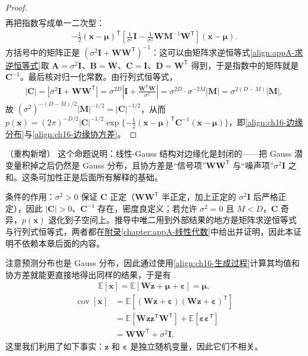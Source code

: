 \documentclass[../../main.tex]{subfiles}
\begin{document}
\begin{proof}
\begin{align*}
\end{align*}
再把指数写成单一二次型：
\begin{align*}
  -\frac{1}{2}(\bm{x}-\bm{\mu})^{\mathsf T}\left[\frac{1}{\sigma^2}\bm{I}-\frac{1}{\sigma^2}\bm{W}\bm{M}^{-1}\bm{W}^{\mathsf T}\right](\bm{x}-\bm{\mu}).
\end{align*}
方括号中的矩阵正是 $(\sigma^2\bm{I}+\bm{W}\bm{W}^{\mathsf T})^{-1}$：这可以由矩阵求逆恒等式\eqref{align:appA-求逆恒等式}取 $\bm{A}=\sigma^2\bm{I}$、$\bm{B}=\bm{W}$、$\bm{C}=\bm{I}$、$\bm{D}=\bm{W}^{\mathsf T}$ 得到，于是指数中的矩阵就是 $\bm{C}^{-1}$。最后核对归一化常数。由行列式恒等式，
\begin{align*}
  |\bm{C}|=\left|\sigma^2\bm{I}+\bm{W}\bm{W}^{\mathsf T}\right|=\sigma^{2D}\left|\bm{I}+\frac{\bm{W}^{\mathsf T}\bm{W}}{\sigma^2}\right|=\sigma^{2D}\cdot\sigma^{-2M}|\bm{M}|=\sigma^{2(D-M)}|\bm{M}|,
\end{align*}
故 $(\sigma^2)^{-(D-M)/2}|\bm{M}|^{-1/2}=|\bm{C}|^{-1/2}$，从而 $p(\bm{x})=(2\pi)^{-D/2}|\bm{C}|^{-1/2}\exp\{-\frac{1}{2}(\bm{x}-\bm{\mu})^{\mathsf T}\bm{C}^{-1}(\bm{x}-\bm{\mu})\}$，即\eqref{align:ch16-边缘分布}与\eqref{align:ch16-边缘协方差}。
\end{proof}

\begin{remark}（重构新增）
这个命题说明：线性-Gauss 结构对边缘化是封闭的——把 Gauss 潜变量积掉之后仍然是 Gauss 分布，且协方差是“信号项”$\bm{W}\bm{W}^{\mathsf T}$ 与“噪声项”$\sigma^2\bm{I}$ 之和。这条可加性正是后面所有解释的基础。

条件的作用：$\sigma^2>0$ 保证 $\bm{C}$ 正定（$\bm{W}\bm{W}^{\mathsf T}$ 半正定，加上正定的 $\sigma^2\bm{I}$ 后严格正定），因此 $|\bm{C}|>0$、$\bm{C}^{-1}$ 存在，密度良定义；若允许 $\sigma^2=0$ 且 $M<D$，$\bm{C}$ 奇异，$p(\bm{x})$ 退化到子空间上。推导中唯二用到外部结果的地方是矩阵求逆恒等式与行列式恒等式，两者都在\hyperref[chapter:appA-线性代数]{附录\ref*{chapter:appA-线性代数}}中给出并证明，因此本证明不依赖本章后面的内容。
\end{remark}

注意预测分布也是 Gauss 分布，因此通过使用\eqref{align:ch16-生成过程}计算其均值和协方差就能更直接地得出同样的结果，于是有
\begin{align}
  \mathbb{E}[\bm{x}]=\mathbb{E}[\bm{W}\bm{z}+\bm{\mu}+\bm{\varepsilon}]=\bm{\mu},
  \label{align:ch16-边缘均值}
\end{align}
\begin{align}
  \operatorname{cov}[\bm{x}]&=\mathbb{E}\left[(\bm{W}\bm{z}+\bm{\varepsilon})(\bm{W}\bm{z}+\bm{\varepsilon})^{\mathsf T}\right]\nonumber\\
  &=\mathbb{E}\left[\bm{W}\bm{z}\bm{z}^{\mathsf T}\bm{W}^{\mathsf T}\right]+\mathbb{E}\left[\bm{\varepsilon}\bm{\varepsilon}^{\mathsf T}\right]\nonumber\\
  &=\bm{W}\bm{W}^{\mathsf T}+\sigma^2\bm{I},
  \label{align:ch16-边缘协方差推导}
\end{align}
这里我们利用了如下事实：$\bm{z}$ 和 $\bm{\varepsilon}$ 是独立随机变量，因此它们不相关。
\end{document}
